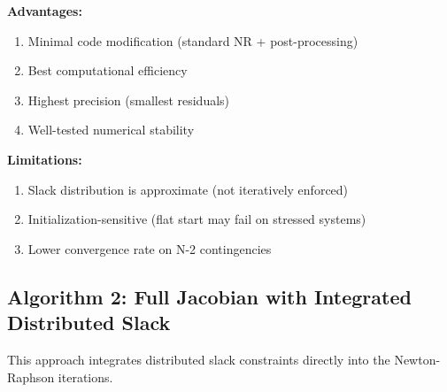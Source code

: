 \documentclass[11pt]{article}
\begin{document}
\textbf{Advantages:}
\begin{enumerate}
    \item Minimal code modification (standard NR + post-processing)
    \item Best computational efficiency
    \item Highest precision (smallest residuals)
    \item Well-tested numerical stability
\end{enumerate}

\textbf{Limitations:}
\begin{enumerate}
    \item Slack distribution is approximate (not iteratively enforced)
    \item Initialization-sensitive (flat start may fail on stressed systems)
    \item Lower convergence rate on N-2 contingencies
\end{enumerate}

\subsection{Algorithm 2: Full Jacobian with Integrated Distributed Slack}

This approach integrates distributed slack constraints directly into the Newton-Raphson iterations.
\end{document}
